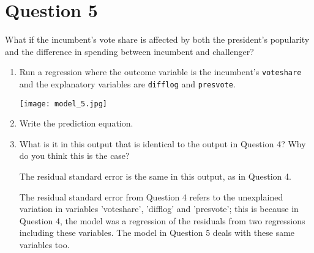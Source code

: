 \documentclass[12pt,letterpaper]{article}
\begin{document}
	\newpage	

\section*{Question 5}
\noindent What if the incumbent's vote share is affected by both the president's popularity and the difference in spending between incumbent and challenger? 
	\begin{enumerate}
		\item Run a regression where the outcome variable is the incumbent's \texttt{voteshare} and the explanatory variables are \texttt{difflog} and \texttt{presvote}.	
			 
		\texttt{[image: model\_5.jpg]}
		\vspace{5cm}
		\item Write the prediction equation.	
			 
		\vspace{.5cm}
		\item What is it in this output that is identical to the output in Question 4? Why do you think this is the case?
	
		\vspace{.5cm}
		The residual standard error is the same in this output, as in Question 4. 
		
		The residual standard error from Question 4 refers to the unexplained variation in variables 'voteshare', 'difflog' and 'presvote'; this is because in Question 4, the model was a regression of the residuals from two regressions including these variables. The model in Question 5 deals with these same variables too. 
	\end{enumerate}
\end{document}
